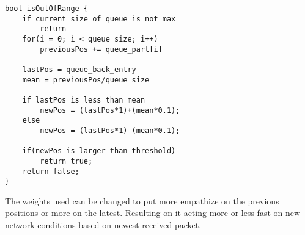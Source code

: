 \noindent
\begin{minipage}[t]{0.95\linewidth}
\begin{lstlisting}[caption=XXX, label={lst:basestation2}]
bool isOutOfRange {
	if current size of queue is not max
		return
	for(i = 0; i < queue_size; i++)
		previousPos += queue_part[i]
		
	lastPos = queue_back_entry
	mean = previousPos/queue_size
	
	if lastPos is less than mean
		newPos = (lastPos*1)+(mean*0.1);
	else
		newPos = (lastPos*1)-(mean*0.1);
	
	if(newPos is larger than threshold)
		return true;
	return false;
}
\end{lstlisting}
\end{minipage}

\noindent The weights used can be changed to put more empathize on the previous positions or more on the latest. Resulting on it acting more or less fast on new network conditions based on newest received packet.